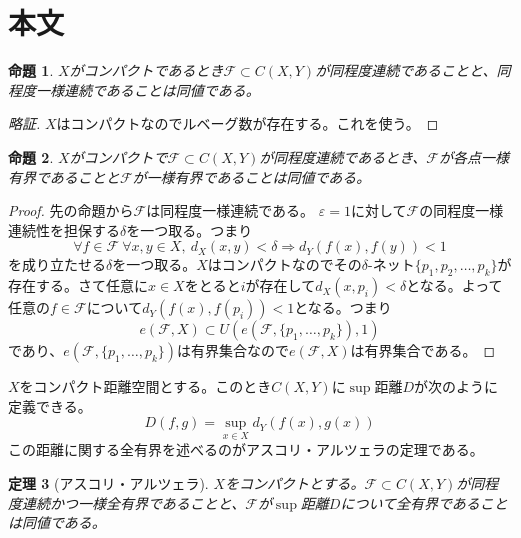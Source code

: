 \documentclass[leqno]{jsarticle}
\newtheorem{thm}{定理}
\newtheorem{prop}[thm]{命題}
\newcommand{\To}{\Longrightarrow}
\newcommand{\ep}{\varepsilon}
\begin{document}
\section{本文}
\begin{prop}
$X$がコンパクトであるとき$\mathcal{F}\subset C(X,Y)$が同程度連続であることと、同程度一様連続であることは同値である。
\end{prop}
\begin{proof}[略証]$X$はコンパクトなのでルベーグ数が存在する。これを使う。
\end{proof}
\begin{prop}
$X$がコンパクトで$\mathcal{F}\subset C(X,Y)$が同程度連続であるとき、$\mathcal{F}$が各点一様有界であることと$\mathcal{F}$が一様有界であることは同値である。
\end{prop}
\begin{proof}
先の命題から$\mathcal{F}$は同程度一様連続である。
$\ep=1$に対して$\mathcal{F}$の同程度一様連続性を担保する$\delta$を一つ取る。つまり
\[
\forall f\in \mathcal{F}\ \forall x,y\in X,\ d_X(x,y)<\delta\To d_Y(f(x),f(y))<1
\]
を成り立たせる$\delta$を一つ取る。$X$はコンパクトなのでその$\delta$-ネット$\{p_1,p_2,\dots, p_k\}$が存在する。さて任意に$x\in X$をとると$i$が存在して$d_X(x,p_i)<\delta$となる。よって任意の$f\in \mathcal{F}$について$d_Y(f(x),f(p_i))<1$となる。つまり
\[
e(\mathcal{F},X)\subset U(e(\mathcal{F},\{p_1,\dots,p_k\}),1)
\]
であり、$e(\mathcal{F},\{p_1,\dots,p_k\})$は有界集合なので$e(\mathcal{F},X)$は有界集合である。
\end{proof}
$X$をコンパクト距離空間とする。このとき$C(X,Y)$に$\sup$距離$D$が次のように定義できる。
\[
D(f,g)=\sup_{x\in X}d_Y(f(x), g(x))
\]
この距離に関する全有界を述べるのがアスコリ・アルツェラの定理である。
\begin{thm}[アスコリ・アルツェラ]
$X$をコンパクトとする。$\mathcal{F}\subset C(X,Y)$が同程度連続かつ一様全有界であることと、$\mathcal{F}$が$\sup$距離$D$について全有界であることは同値である。
\end{thm}
\end{document}
